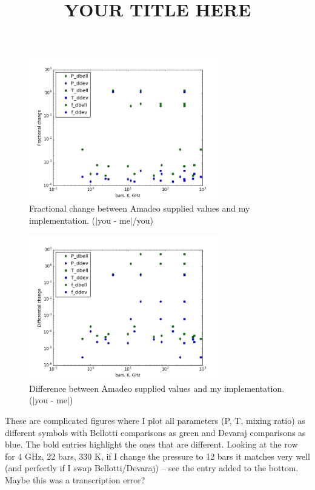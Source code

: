 \documentclass[11pt]{article}
\begin{document}
\title{YOUR TITLE HERE}

\begin{figure}[H]
\centering
\includegraphics[width=0.75\textwidth]{pc.png}
\caption{Fractional change between Amadeo supplied values and my implementation. \newline ($|$you - me$|$/you)}
\end{figure}

\begin{figure}[H]
\centering
\includegraphics[width=0.75\textwidth]{dc.png}
\caption{Difference between Amadeo supplied values and my implementation.  \newline ($|$you - me$|$)}
\end{figure}

\newpage
These are complicated figures where I plot all parameters (P, T, mixing ratio) as different symbols with Bellotti comparisons as green and Devaraj comparisons as blue.  The bold entries highlight the ones that are different.  Looking at the row for 4 GHz, 22 bars, 330 K, if I change the pressure to 12 bars it matches very well (and perfectly if I swap Bellotti/Devaraj) -- see the entry added to the bottom.  Maybe this was a transcription error?
\end{document}
